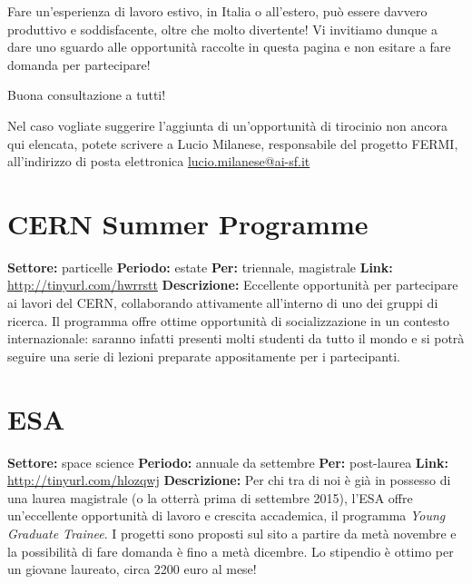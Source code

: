 \documentclass[a4paper,10pt]{article}
\begin{document}
Fare un’esperienza di lavoro estivo, in Italia o all’estero, può essere davvero produttivo e soddisfacente, oltre che molto divertente! Vi invitiamo dunque a dare uno sguardo alle opportunità raccolte in questa pagina e non esitare a fare domanda per partecipare! \newline

Buona consultazione a tutti! \newline

Nel caso vogliate suggerire l’aggiunta di un’opportunità di tirocinio non ancora qui elencata, potete scrivere a Lucio Milanese, responsabile del progetto FERMI, all’indirizzo di posta elettronica \href{mailto:lucio.milanese@ai-sf.it}{lucio.milanese@ai-sf.it}

\tableofcontents

\section{CERN Summer Programme}

\textbf{Settore:} particelle \newline %
\textbf{Periodo:} estate \newline
\textbf{Per:} triennale, magistrale \newline
\textbf{Link:}	\url{http://tinyurl.com/hwrrstt} \newline %
\textbf{Descrizione:} Eccellente opportunità per partecipare ai lavori del CERN, collaborando attivamente all’interno di uno dei gruppi di ricerca. Il programma offre ottime opportunità di socializzazione in un contesto internazionale: saranno infatti presenti molti studenti da tutto il mondo e si potrà seguire una serie di lezioni preparate appositamente per i partecipanti.	


\section{ESA} 

\textbf{Settore:} space science \newline
\textbf{Periodo:} annuale da settembre \newline
\textbf{Per:} post-laurea \newline
\textbf{Link:} \url{http://tinyurl.com/hlozqwj} \newline
\textbf{Descrizione:} Per chi tra di noi è già in possesso di una laurea magistrale (o la otterrà prima di settembre 2015), l'ESA offre un'eccellente opportunità di lavoro e crescita accademica, il programma \emph{Young Graduate Trainee}. I progetti sono proposti sul sito a partire da metà novembre e la possibilità di fare domanda è fino a metà dicembre. Lo stipendio è ottimo per un giovane laureato, circa 2200 euro al mese!
\end{document}
